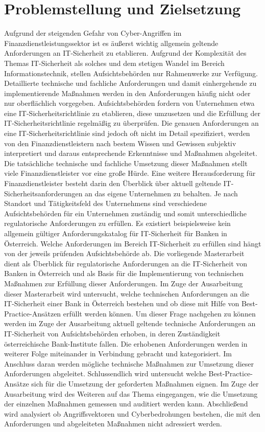 \section{Problemstellung und Zielsetzung}
\label{cha:zielsetzung}
Aufgrund der steigenden Gefahr von Cyber-Angriffen im Finanzdienstleistungssektor ist es äußerst wichtig allgemein geltende Anforderungen an IT-Sicherheit zu etablieren. Aufgrund der Komplexität des Themas IT-Sicherheit als solches und dem stetigen Wandel im Bereich Informationstechnik, stellen Aufsichtsbehörden nur Rahmenwerke zur Verfügung. Detaillierte technische und fachliche Anforderungen und damit einhergehende zu implementierende Maßnahmen werden in den Anforderungen häufig nicht oder nur oberflächlich vorgegeben. Aufsichtsbehörden fordern von Unternehmen etwa eine IT-Sicherheitsrichtlinie zu etablieren, diese umzusetzen und die Erfüllung der IT-Sicherheitsrichtlinie regelmäßig zu überprüfen. Die genauen Anforderungen an eine IT-Sicherheitsrichtlinie sind jedoch oft nicht im Detail spezifiziert, werden von den Finanzdienstleistern nach bestem Wissen und Gewissen subjektiv interpretiert und daraus entsprechende Erkenntnisse und Maßnahmen abgeleitet. Die tatsächliche technische und fachliche Umsetzung dieser Maßnahmen stellt viele Finanzdienstleister vor eine große Hürde. Eine weitere Herausforderung für Finanzdienstleister besteht darin den Überblick über aktuell geltende IT-Sicherheitsanforderungen an das eigene Unternehmen zu behalten. Je nach Standort und Tätigkeitsfeld des Unternehmens sind verschiedene Aufsichtsbehörden für ein Unternehmen zuständig und somit unterschiedliche regulatorische Anforderungen zu erfüllen. Es existiert beispielsweise kein allgemein gültiger Anforderungskatalog für IT-Sicherheit für Banken in Österreich. Welche Anforderungen im Bereich IT-Sicherheit zu erfüllen sind hängt von der jeweils prüfenden Aufsichtsbehörde ab.
\bigbreak
Die vorliegende Masterarbeit dient als Überblick für regulatorische Anforderungen an die IT-Sicherheit von Banken in Österreich und als Basis für die Implementierung von technischen Maßnahmen zur Erfüllung dieser Anforderungen. Im Zuge der Ausarbeitung dieser Masterarbeit wird untersucht, welche technischen Anforderungen an die IT-Sicherheit einer Bank in Österreich bestehen und ob diese mit Hilfe von Best-Practice-Ansätzen erfüllt werden können. Um dieser Frage nachgehen zu können werden im Zuge der Ausarbeitung aktuell geltende technische Anforderungen an IT-Sicherheit von Aufsichtsbehörden erhoben, in deren Zuständigkeit österreichische Bank-Institute fallen. Die erhobenen Anforderungen werden in weiterer Folge miteinander in Verbindung gebracht und kategorisiert. Im Anschluss daran werden mögliche technische Maßnahmen zur Umsetzung dieser Anforderungen abgeleitet. Schlussendlich wird untersucht welche Best-Practice-Ansätze sich für die Umsetzung der geforderten Maßnahmen eignen. Im Zuge der Ausarbeitung wird des Weiteren auf das Thema eingegangen, wie die Umsetzung der einzelnen Maßnahmen gemessen und auditiert werden kann. Abschließend wird analysiert ob Angriffsvektoren und Cyberbedrohungen bestehen, die mit den Anforderungen und abgeleiteten Maßnahmen nicht adressiert werden. 
